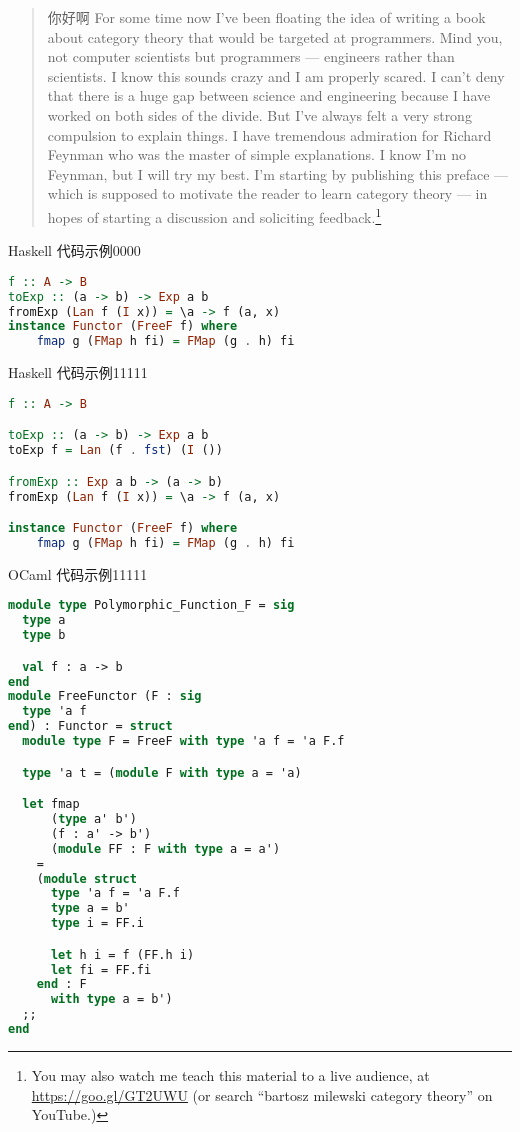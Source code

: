 
\begin{quote}
  你好啊
  For some time now I've been floating the idea of writing a book about
  category theory that would be targeted at programmers. Mind you, not
  computer scientists but programmers --- engineers rather than
  scientists. I know this sounds crazy and I am properly scared. I can't
  deny that there is a huge gap between science and engineering because I
  have worked on both sides of the divide. But I've always felt a very
  strong compulsion to explain things. I have tremendous admiration for
  Richard Feynman who was the master of simple explanations. I know I'm no
  Feynman, but I will try my best. I'm starting by publishing this preface
  --- which is supposed to motivate the reader to learn category theory
  --- in hopes of starting a discussion and soliciting feedback.\footnote{
    You may also watch me teach this material to a live audience, at
    \href{https://goo.gl/GT2UWU}{https://goo.gl/GT2UWU} (or search
    ``bartosz milewski category theory'' on YouTube.)}
\end{quote}

{Haskell 代码示例0000}
\begin{lstlisting}[language=Haskell]
f :: A -> B
toExp :: (a -> b) -> Exp a b
fromExp (Lan f (I x)) = \a -> f (a, x)
instance Functor (FreeF f) where
    fmap g (FMap h fi) = FMap (g . h) fi
\end{lstlisting}

{Haskell 代码示例11111}
\begin{lstlisting}[language=Haskell]
f :: A -> B

toExp :: (a -> b) -> Exp a b
toExp f = Lan (f . fst) (I ())

fromExp :: Exp a b -> (a -> b)
fromExp (Lan f (I x)) = \a -> f (a, x)

instance Functor (FreeF f) where
    fmap g (FMap h fi) = FMap (g . h) fi
\end{lstlisting}

{OCaml 代码示例11111}
\begin{lstlisting}[language=Caml]
module type Polymorphic_Function_F = sig
  type a
  type b

  val f : a -> b
end
module FreeFunctor (F : sig
  type 'a f
end) : Functor = struct
  module type F = FreeF with type 'a f = 'a F.f

  type 'a t = (module F with type a = 'a)

  let fmap
      (type a' b')
      (f : a' -> b')
      (module FF : F with type a = a')
    =
    (module struct
      type 'a f = 'a F.f
      type a = b'
      type i = FF.i

      let h i = f (FF.h i)
      let fi = FF.fi
    end : F
      with type a = b')
  ;;
end

\end{lstlisting}


